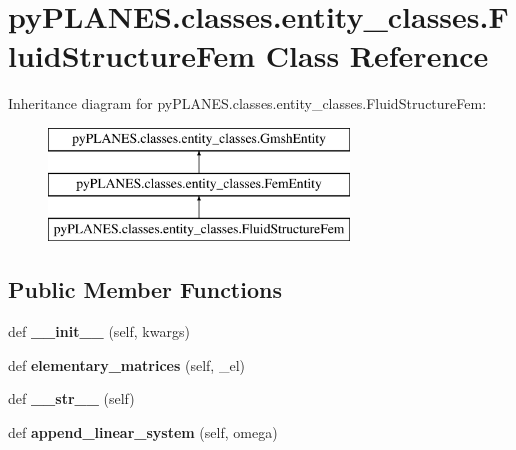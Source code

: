 \hypertarget{classpy_p_l_a_n_e_s_1_1classes_1_1entity__classes_1_1_fluid_structure_fem}{}\section{py\+P\+L\+A\+N\+E\+S.\+classes.\+entity\+\_\+classes.\+Fluid\+Structure\+Fem Class Reference}
\label{classpy_p_l_a_n_e_s_1_1classes_1_1entity__classes_1_1_fluid_structure_fem}
Inheritance diagram for py\+P\+L\+A\+N\+E\+S.\+classes.\+entity\+\_\+classes.\+Fluid\+Structure\+Fem\+:\begin{figure}[H]
\begin{center}
\leavevmode
\includegraphics[height=3.000000cm]{classpy_p_l_a_n_e_s_1_1classes_1_1entity__classes_1_1_fluid_structure_fem}
\end{center}
\end{figure}
\subsection*{Public Member Functions}
\begin{DoxyCompactItemize}
\item 
\mbox{\label{classpy_p_l_a_n_e_s_1_1classes_1_1entity__classes_1_1_fluid_structure_fem_acbe38b6ddf617a116355ca0b2c3f2ad4}} 
def {\bfseries \+\_\+\+\_\+init\+\_\+\+\_\+} (self, kwargs)
\item 
\mbox{\label{classpy_p_l_a_n_e_s_1_1classes_1_1entity__classes_1_1_fluid_structure_fem_a257b04e97ca4699c69c8f3197d1c67ba}} 
def {\bfseries elementary\+\_\+matrices} (self, \+\_\+el)
\item 
\mbox{\label{classpy_p_l_a_n_e_s_1_1classes_1_1entity__classes_1_1_fluid_structure_fem_ae44887442c22938a36ff724f7f32b040}} 
def {\bfseries \+\_\+\+\_\+str\+\_\+\+\_\+} (self)
\item 
\mbox{\label{classpy_p_l_a_n_e_s_1_1classes_1_1entity__classes_1_1_fluid_structure_fem_a49ee0683cd8ba82c1bbfeded355ec9aa}} 
def {\bfseries append\+\_\+linear\+\_\+system} (self, omega)
\end{DoxyCompactItemize}

